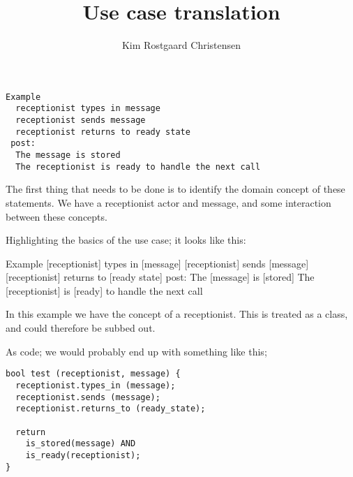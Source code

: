 \documentclass[10pt,a4paper]{article}
\author{Kim Rostgaard Christensen}
\begin{document}
\title{Use case translation}
\maketitle

\begin{verbatim}
Example 
  receptionist types in message
  receptionist sends message
  receptionist returns to ready state
 post:
  The message is stored
  The receptionist is ready to handle the next call
\end{verbatim}  
The first thing that needs to be done is to identify the domain concept of these statements. We have  a receptionist actor and message, and some interaction between these concepts.

Highlighting the basics of the use case; it looks like this:
  
Example 
  [receptionist] {types in} [message]
  [receptionist] {sends} [message]
  [receptionist] {returns to} [ready state]
 post:
  The [message] {is} [stored]
  The [receptionist] {is} [ready] to handle the next call


In this example we have the concept of a receptionist. This is treated as a class, and could therefore be subbed out.

As code; we would probably end up with something like this;

\begin{lstlisting}
bool test (receptionist, message) {
  receptionist.types_in (message);
  receptionist.sends (message);
  receptionist.returns_to (ready_state);
  
  return
    is_stored(message) AND
    is_ready(receptionist);
}
\end{lstlisting}
\end{document}
